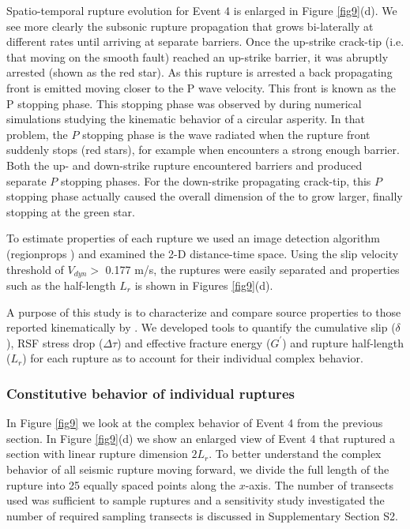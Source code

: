\documentclass[preprint,1p, 10pt,authoryear]{elsarticle}
\begin{document}
Spatio-temporal rupture evolution for Event 4 is enlarged in Figure \ref{fig9}(d).  We see more clearly the subsonic rupture propagation that grows bi-laterally at different rates until arriving at separate barriers. Once the up-strike crack-tip (i.e. that moving on the smooth fault) reached an up-strike barrier, it was abruptly arrested (shown as the red star).  As this rupture is arrested a back propagating front is emitted moving closer to the P wave velocity.  This front is known as the P stopping phase.  This stopping phase was observed by \citet{Madariaga1976} during numerical simulations studying the kinematic behavior of a circular asperity.  In that problem, the $P$ stopping phase is the wave radiated when the rupture front suddenly stops (red stars), for example when encounters a strong enough barrier.  Both the up- and down-strike rupture encountered barriers and produced separate $P$ stopping phases.  For the down-strike propagating crack-tip, this $P$ stopping phase actually caused the overall dimension of the to grow larger, finally stopping at the green star. 

To estimate properties of each rupture we used an image detection algorithm (regionprops \citep{Matlab}) and examined the 2-D distance-time space. Using the slip velocity threshold of $V_{dyn}>$ 0.177 m/s, the ruptures were easily separated and properties such as the half-length $L_{r}$ is shown in Figures \ref{fig9}(d).

A purpose of this study is to characterize and compare source properties to those reported kinematically by \citet{Selvadurai2019}. We developed tools to quantify the cumulative slip ($\delta$), RSF stress drop ($\Delta \tau$) and effective fracture energy ($G^{'}$) and rupture half-length ($L_{r}$) for each rupture as to account for their individual complex behavior.

\subsubsection{Constitutive behavior of individual ruptures }
\label{Constitutive}
In Figure \ref{fig9} we look at the complex behavior of Event 4 from the previous section.  In Figure \ref{fig9}(d) we show an enlarged view of Event 4 that ruptured a section with linear rupture dimension $2L_{r}$.  To better understand the complex behavior of all seismic rupture moving forward, we divide the full length of the rupture into 25 equally spaced points along the $x$-axis. The number of transects used was sufficient to sample ruptures and a sensitivity study investigated the number of required sampling transects is discussed in Supplementary Section S2.   
\end{document}
